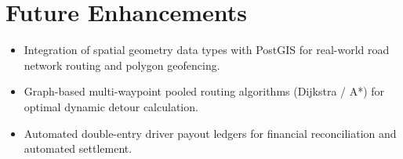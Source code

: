 \section{Future Enhancements}
\begin{itemize}[itemsep=1.5pt, topsep=2pt, parsep=0pt]
    \item Integration of spatial geometry data types with PostGIS for real-world road network routing and polygon geofencing.
    \item Graph-based multi-waypoint pooled routing algorithms (Dijkstra / A*) for optimal dynamic detour calculation.
    \item Automated double-entry driver payout ledgers for financial reconciliation and automated settlement.
\end{itemize}
